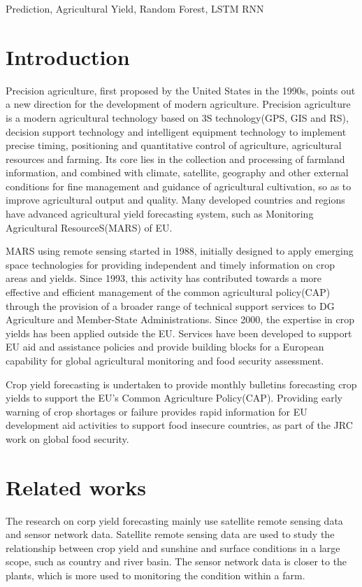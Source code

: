\documentclass[conference]{IEEEtran}
\begin{document}
\begin{IEEEkeywords}
Prediction, Agricultural Yield, Random Forest, LSTM RNN
\end{IEEEkeywords}

\section{Introduction}
Precision agriculture, first proposed by the United States in the 1990s, points out a new direction for the development of modern agriculture. Precision agriculture is a modern agricultural technology based on 3S technology(GPS, GIS and RS), decision support technology and intelligent equipment technology to implement precise timing, positioning and quantitative control of agriculture, agricultural resources and farming. Its core lies in the collection and processing of farmland information, and combined with climate, satellite, geography and other external conditions for fine management and guidance of agricultural cultivation, so as to improve agricultural output and quality. Many developed countries and regions have advanced agricultural yield forecasting system, such as Monitoring Agricultural ResourceS(MARS) of EU.

MARS using remote sensing started in 1988, initially designed to apply emerging space technologies for providing independent and timely information on crop areas and yields. Since 1993, this activity has contributed towards a more effective and efficient management of the common agricultural policy(CAP) through the provision of a broader range of technical support services to DG Agriculture and Member-State Administrations. Since 2000, the expertise in crop yields has been applied outside the EU. Services have been developed to support EU aid and assistance policies and provide building blocks for a European capability for global agricultural monitoring and food security assessment.

Crop yield forecasting is undertaken to provide monthly bulletins forecasting crop yields to support the EU's Common Agriculture Policy(CAP). Providing early warning of crop shortages or failure provides rapid information for EU development aid activities to support food insecure countries, as part of the JRC work on global food security.


\section{Related works}
The research on corp yield forecasting mainly use satellite remote sensing data and sensor network data. Satellite remote sensing data are used to study the relationship between crop yield and sunshine and surface conditions in a large scope, such as country and river basin. The sensor network data is closer to the plants, which is more used to monitoring the condition within a farm. 
\end{document}

